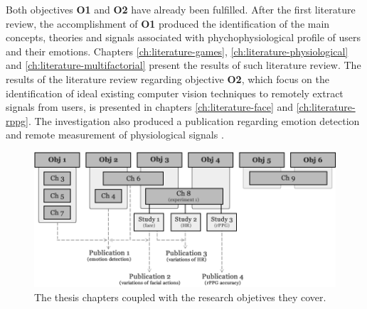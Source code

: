 
Both objectives \textbf{O1} and \textbf{O2} have already been fulfilled. After the first literature review, the accomplishment of \textbf{O1} produced the identification of the main concepts, theories and signals associated with phychophysiological profile of users and their emotions. Chapters \ref{ch:literature-games}, \ref{ch:literature-physiological} and \ref{ch:literature-multifactorial} present the results of such literature review. The results of the literature review regarding objective \textbf{O2}, which focus on the identification of ideal existing computer vision techniques to remotely extract signals from users, is presented in chapters \ref{ch:literature-face} and \ref{ch:literature-rppg}. The investigation also produced a publication regarding emotion detection and remote measurement of physiological signals \parencite{bevilacqua2015proposal}.

\begin{figure}[ht]
    \centering
    \includegraphics[width=\textwidth]{figures/research-current-state.png}
    \caption{The thesis chapters coupled with the research objetives they cover.}
    \label{fig:research-current-state}
\end{figure}

